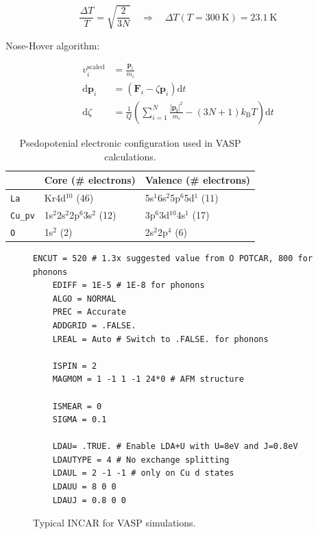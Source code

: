 \[ \frac{\Delta T}{T} = \sqrt{\frac{2}{3N}} \quad \Rightarrow \quad \Delta T(T=\SI{300}{\kelvin}) = \SI{23.1}{\kelvin} \]

\noindent Nose-Hover algorithm:

\begin{align*}
v_i^\text{scaled} &= \frac{\bm{p}_i}{m_i} \\
\text{d}\bm{p}_i &= (\bm{F}_i - \zeta \bm{p}_i) \text{d}t \\
\text{d}\zeta &= \frac{1}{Q} \left( \sum_{i=1}^N \frac{|\bm{p_i}|^2}{m_i} - (3N+1)k_\text{B}T\right) \text{d}t
\end{align*}

\begin{table}[b]
\centering
\begin{tabular}{@{}lll@{}}
\toprule
 & Core (\# electrons) & Valence (\# electrons)                        \\ \midrule
\texttt{La}                 & Kr4d$^{10}$ (46)                & 5s$^1$6s$^2$5p$^6$5d$^1$ (11) \\
\texttt{Cu\_pv}                 & 1s$^2$2s$^2$2p$^6$3s$^2$ (12) & 3p$^6$3d$^{10}$4s$^1$ (17)      \\
\texttt{O}                  & 1s$^2$ (2)                    & 2s$^2$2p$^4$ (6)              \\ \bottomrule
\end{tabular}
\caption[VASP Pseudopotentials]{Psedopotenial electronic configuration used in VASP calculations.}
\label{tab:vasp_pseudo}
\end{table}

\begin{figure}
    \centering
    \begin{lstlisting}[basicstyle=\footnotesize\ttfamily, frame=single]
    ENCUT = 520 # 1.3x suggested value from O POTCAR, 800 for phonons
    EDIFF = 1E-5 # 1E-8 for phonons
    ALGO = NORMAL
    PREC = Accurate
    ADDGRID = .FALSE.
    LREAL = Auto # Switch to .FALSE. for phonons
    
    ISPIN = 2
    MAGMOM = 1 -1 1 -1 24*0 # AFM structure
    
    ISMEAR = 0
    SIGMA = 0.1
    
    LDAU= .TRUE. # Enable LDA+U with U=8eV and J=0.8eV
    LDAUTYPE = 4 # No exchange splitting
    LDAUL = 2 -1 -1 # only on Cu d states
    LDAUU = 8 0 0 
    LDAUJ = 0.8 0 0
    \end{lstlisting}
    \caption[VASP: Typical INCAR]{Typical INCAR for VASP simulations.}
    \label{fig:incar}
\end{figure}

